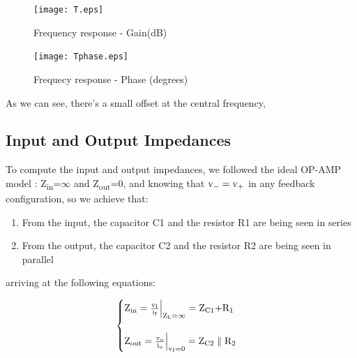 \begin{figure}[h] \centering
  \begin{minipage}{.45\textwidth}
    \texttt{[image: T.eps]}
    \caption{Frequency response - Gain(dB)}\label{fig:theo:gain}
  \end{minipage}%
    \hspace{2 mm}
  \begin{minipage}{.45\textwidth}
  \centering
    \texttt{[image: Tphase.eps]}
    \caption{Frequecy response - Phase (degrees)}\label{fig:theo:phase}
      \end{minipage}
\end{figure}

As we can see, there's a small offset at the central frequency,
\newpage
\subsection{Input and Output Impedances}

To compute the input and output impedances, we followed the ideal OP-AMP model : Z\textsubscript{in}=$\infty$ and Z\textsubscript{out}=0, and knowing that $\text v_- = \text v_+$ in any feedback configuration, so we achieve that:

\begin{enumerate}
 \item From the input, the capacitor C1 and the resistor R1 are being seen in series
 \item From the output, the capacitor C2 and the resistor R2 are being seen in parallel
\end{enumerate}

arriving at the following equations:


\begin{equation}\label{impedances}
\begin{cases}
    \text{Z\textsubscript{in}} = \frac{\text v_\text I}{\text i_\text I}\Bigr|_{\text{Z\textsubscript L}=\infty} = \text{Z\textsubscript{C1}+R\textsubscript{1}}\\
    
    \\
    
    \text{Z\textsubscript{out}} = \frac{\text v_\text o}{\text i_\text o}\Bigr|_{\text v_\text I=0} =  \text{Z\textsubscript{C2}} \parallel \text{R\textsubscript{2}}  \\

 \end{cases}
\end{equation}


